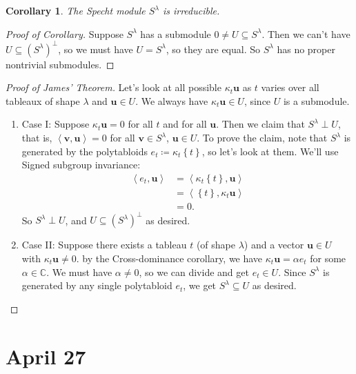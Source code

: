 \documentclass[12pt]{article}
\newcommand{\cx}{\mathbb{C}}
\newcommand\paren[1]{\left( #1 \right)}
\newcommand\setb[1]{\left \{ #1 \right \}}
\newcommand{\vbrack}[1]{\left \langle #1 \right \rangle}
\newtheorem{corollary}[theorem]{Corollary}
\theoremstyle{definition}
\begin{document}
\begin{corollary}
    The Specht module $S^{\lambda}$ is irreducible.
\end{corollary}
\begin{proof}[Proof of Corollary]
    Suppose $S^{\lambda}$ has a submodule $0 \neq U \subseteq S^{\lambda}$. Then we can't have $U \subseteq \paren{ S^{\lambda} }^{\perp}$, so we must have $U = S^{\lambda}$, so they are equal. So $S^{\lambda}$ has no proper nontrivial submodules.
\end{proof}
\begin{proof}[Proof of James' Theorem]
    Let's look at all possible $\kappa_t \mathbf{u}$ as $t$ varies over all tableaux of shape $\lambda$ and $\mathbf{u} \in U$. We always have $\kappa_t \mathbf{u} \in U$, since $U$ is a submodule.
    \begin{enumerate}
        \item Case I: Suppose $\kappa_t \mathbf{u} = 0$ for all $t$ and for all $\mathbf{u}$. Then we claim that $S^{\lambda} \perp U$, that is, $\vbrack{ \mathbf{v} , \mathbf{u} } = 0$ for all $\mathbf{v} \in S^{\lambda}$, $\mathbf{u} \in U$. To prove the claim, note that $S^{\lambda}$ is generated by the polytabloids $e_t \coloneqq  \kappa_t \setb{ t }$, so let's look at them. We'll use Signed subgroup invariance:
        \begin{align*}
            \vbrack{ e_t , \mathbf{u} } & = \vbrack{ \kappa_t \setb{ t } , \mathbf{u} } \\
            & = \vbrack{ \setb{ t } , \kappa_t \mathbf{u} } \\
            & = 0.
        \end{align*}
        So $S^{\lambda} \perp U$, and $U \subseteq \paren{ S^{\lambda} }^{\perp}$ as desired.
        \item Case II: Suppose there exists a tableau $t$ (of shape $\lambda$) and a vector $\mathbf{u} \in U$ with $\kappa_t \mathbf{u} \neq 0$. by the Cross-dominance corollary, we have $\kappa_t \mathbf{u} = \alpha e_t$ for some $\alpha \in \cx$. We must have $\alpha \neq 0$, so we can divide and get $e_t \in U$. Since $S^{\lambda}$ is generated by any single polytabloid $e_t$, we get $S^{\lambda} \subseteq U$ as desired.
    \end{enumerate}
\end{proof}

\section{April 27}
\end{document}
